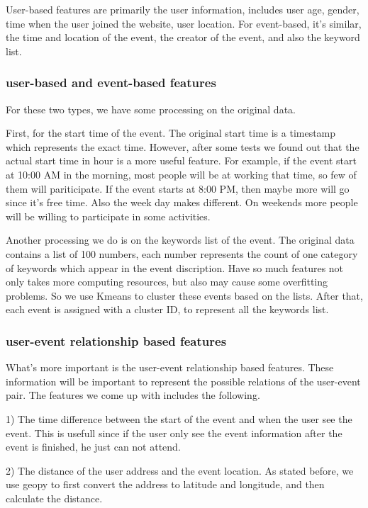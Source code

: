 \documentclass{article} %
\begin{document}
User-based features are primarily the user information, includes user age, gender, time when the user joined the website, user location. For event-based, it's similar, the time and location of the event, the creator of the event, and also the keyword list. 

\subsubsection{user-based and event-based features}

For these two types, we have some processing on the original data.

First, for the start time of the event. The original start time is a timestamp which represents the exact time. However, after some tests we found out that the actual start time in hour is a more useful feature. For example, if the event start at 10:00 AM in the morning, most people will be at working that time, so few of them will pariticipate. If the event starts at 8:00 PM, then maybe more will go since it's free time. Also the week day makes different. On weekends more people will be willing to participate in some activities.

Another processing we do is on the keywords list of the event. The original data contains a list of 100 numbers, each number represents the count of one category of keywords which appear in the event discription. Have so much features not only takes more computing resources, but also may cause some overfitting problems. So we use Kmeans to cluster these events based on the lists. After that, each event is assigned with a cluster ID, to represent all the keywords list.

\subsubsection{user-event relationship based features}

What's more important is the user-event relationship based features. These information will be important to represent the possible relations of the user-event pair. The features we come up with includes the following.

1) The time difference between the start of the event and when the user see the event. This is usefull since if the user only see the event information after the event is finished, he just can not attend.

2) The distance of the user address and the event location. As stated before, we use geopy to first convert the address to latitude and longitude, and then calculate the distance.
\end{document}
